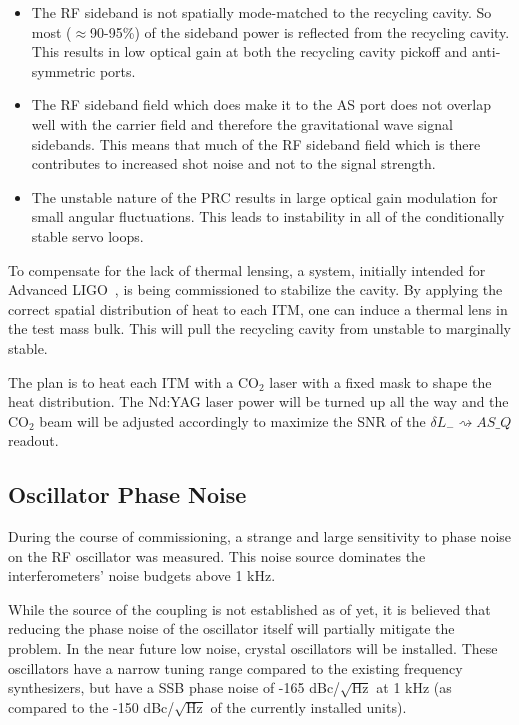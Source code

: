 \begin{itemize}
\item The RF sideband is not spatially mode-matched to the recycling cavity. 
      So most ($\approx$90-95\%) of the sideband power is reflected from the
      recycling cavity. This
      results in low optical gain at both the recycling cavity pickoff and 
      anti-symmetric ports.

\item The RF sideband field which does make it to the AS port does not overlap
      well with the carrier field and therefore the gravitational wave signal sidebands. This
      means that much of the RF sideband field which is there contributes 
      to increased shot noise and not to the signal strength.

\item The unstable nature of the PRC results in large optical gain modulation
      for small angular fluctuations. This leads to instability in all of the
      conditionally stable servo loops.
\end{itemize}

To compensate for the lack of thermal lensing, a system, initially intended
for Advanced LIGO~\cite{Ryan:Thesis}, is being commissioned to
stabilize the cavity. By applying the correct spatial distribution of heat 
to each ITM, one can induce a thermal lens in the test mass bulk. This will
pull the recycling cavity from unstable to marginally stable. 

The plan is to heat each ITM with a CO$_2$ laser with a fixed mask to shape 
the heat distribution. The Nd:YAG laser power will be turned up all the way 
and the CO$_2$ beam will be adjusted accordingly to maximize the SNR of the
$\delta L_{-} \rightsquigarrow AS\_Q$ readout.


\subsection{Oscillator Phase Noise}

During the course of commissioning, a strange and large sensitivity to phase
noise on the RF oscillator was measured. This noise source dominates the 
interferometers' noise budgets above 1 kHz.

While the source of the coupling is not established as of yet, it is believed
that reducing the phase noise of the oscillator itself will partially
mitigate the problem. In the near future low noise, crystal oscillators will
be installed. These oscillators have a narrow tuning range compared to the
existing frequency synthesizers, but have a SSB phase noise of -165 dBc/$\sqrt{\mbox{Hz}}$
at 1 kHz (as compared to the -150 dBc/$\sqrt{\mbox{Hz}}$ of the currently installed units).


